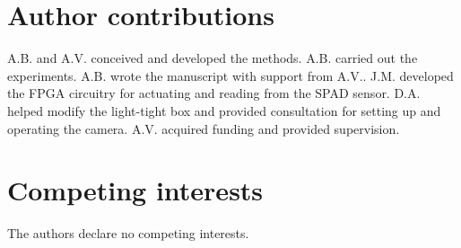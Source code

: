 \documentclass{article}
\begin{document}
\section{Author contributions}
A.B. and A.V. conceived and developed the methods. 
A.B. carried out the experiments. 
A.B. wrote the manuscript with support from A.V..
J.M. developed the FPGA circuitry for actuating and reading from the SPAD sensor. 
D.A. helped modify the light-tight box and provided consultation for setting up and operating the camera.
A.V. acquired funding and provided supervision.


\section{Competing interests}
The authors declare no competing interests.




\newpage
\end{document}

